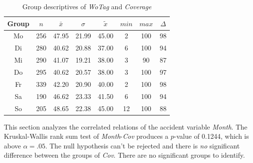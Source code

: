 \begin{table}[ht!]
	\tiny
	\centering
    \begin{tabular}{c|c|c|c|c|c|c|c}
        \toprule
        Group & $n$ & $\bar{x}$ & $\sigma$ & $\tilde{x}$ & $min$ & $max$ & $\Delta$ \\ 
        \midrule
        Mo & 256 & 47.95 & 21.99 & 45.00 & 2  & 100 & 98 \\ 
        Di & 280 & 40.62 & 20.88 & 37.00 & 6  & 100 & 94 \\ 
        Mi & 290 & 41.07 & 19.21 & 38.00 & 3  & 90  & 87 \\ 
        Do & 295 & 40.62 & 20.57 & 38.00 & 3  & 100 & 97 \\ 
        Fr & 339 & 42.20 & 20.90 & 40.00 & 2  & 100 & 98 \\ 
        Sa & 190 & 46.62 & 23.33 & 41.50 & 6  & 100 & 94 \\ 
        So & 205 & 48.65 & 22.38 & 45.00 & 12 & 100 & 88 \\ 
        \bottomrule
      \end{tabular}
	\caption{Group descriptives of \textit{WoTag} and \textit{Coverage}}
	\label{tbl:descriptives_baysis_matched_WoTag_Cov}
\end{table}

This section analyzes the correlated relations of the accident variable \textit{Month}. The Kruskal-Wallis rank sum test of \textit{Month}-\textit{Cov} produces a $p$-value of 0.1244, which is above $\alpha=.05$. The null hypothesis can't be rejected and there is \textit{no} significant difference between the groups of \textit{Cov}. There are no significant groups to identify.

\pagebreak